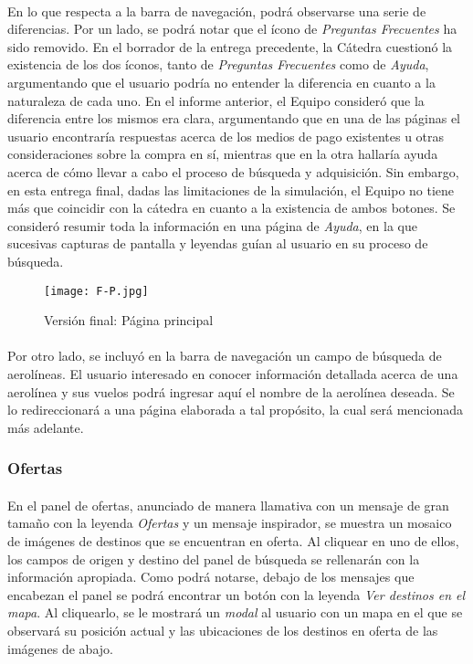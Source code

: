 \documentclass[spanish]{article}
\begin{document}
	\paragraph{} En lo que respecta a la barra de navegación, podrá observarse una serie de diferencias. Por un lado, se podrá notar que el ícono de \textit{Preguntas Frecuentes} ha sido removido. En el borrador de la entrega precedente, la Cátedra cuestionó la existencia de los dos íconos, tanto de \textit{Preguntas Frecuentes} como de \textit{Ayuda}, argumentando que el usuario podría no entender la diferencia en cuanto a la naturaleza de cada uno. En el informe anterior, el Equipo consideró que la diferencia entre los mismos era clara, argumentando que en una de las páginas el usuario encontraría respuestas acerca de los medios de pago existentes u otras consideraciones sobre la compra en sí, mientras que en la otra hallaría ayuda acerca de cómo llevar a cabo el proceso de búsqueda y adquisición. Sin embargo, en esta entrega final, dadas las limitaciones de la simulación, el Equipo no tiene más que coincidir con la cátedra en cuanto a la existencia de ambos botones. Se consideró resumir toda la información en una página de \textit{Ayuda}, en la que sucesivas capturas de pantalla y leyendas guían al usuario en su proceso de búsqueda.
			\begin{figure}[h]
				\centering
				\texttt{[image: F-P.jpg]}
				\caption{Versión final: Página principal}
			\end{figure} 
	\paragraph{} Por otro lado, se incluyó en la barra de navegación un campo de búsqueda de aerolíneas. El usuario interesado en conocer información detallada acerca de una aerolínea y sus vuelos podrá ingresar aquí el nombre de la aerolínea deseada. Se lo redireccionará a una página elaborada a tal propósito, la cual será mencionada más adelante.
	\subsubsection{Ofertas}
	\paragraph{} En el panel de ofertas, anunciado de manera llamativa con un mensaje de gran tamaño con la leyenda \textit{Ofertas} y un mensaje inspirador, se muestra un mosaico de imágenes de destinos que se encuentran en oferta. Al cliquear en uno de ellos, los campos de origen y destino del panel de búsqueda se rellenarán con la información apropiada. Como podrá notarse, debajo de los mensajes que encabezan el panel se podrá encontrar un botón con la leyenda \textit{Ver destinos en el mapa}. Al cliquearlo, se le mostrará un  \textit{modal} al usuario con un mapa en el que se observará su posición actual y las ubicaciones de los destinos en oferta de las imágenes de abajo. 
\end{document}

